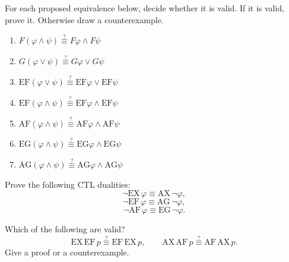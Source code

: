 \documentclass[11pt,a4paper]{tutorial}
\newcommand{\EX}{\mathrm{EX}}
\newcommand{\AX}{\mathrm{AX}}
\newcommand{\EF}{\mathrm{EF}}
\newcommand{\AF}{\mathrm{AF}}
\newcommand{\EG}{\mathrm{EG}}
\newcommand{\AG}{\mathrm{AG}}
\begin{document}
\begin{exercise}
For each proposed equivalence below, decide whether it is valid.
If it is valid, prove it.  Otherwise draw a counterexample.
\begin{enumerate}[label=(\alph*),itemsep=0.75\baselineskip]
  \item \hfil
  \(F(\varphi\land\psi)
    \stackrel{?}{\equiv}
    F\varphi\land F\psi\)
  \hfil

  \item \hfil
  \(G(\varphi\lor\psi)
    \stackrel{?}{\equiv}
    G\varphi\lor G\psi\)
  \hfil

  \item \hfil
  \(\EF(\varphi\lor\psi)
    \stackrel{?}{\equiv}
    \EF\varphi\lor \EF\psi\)
  \hfil

  \item \hfil
  \(\EF(\varphi\land\psi)
    \stackrel{?}{\equiv}
    \EF\varphi\land \EF\psi\)
  \hfil

  \item \hfil
  \(\AF(\varphi\land\psi)
    \stackrel{?}{\equiv}
    \AF\varphi\land \AF\psi\)
  \hfil

  \item \hfil
  \(\EG(\varphi\land\psi)
    \stackrel{?}{\equiv}
    \EG\varphi\land \EG\psi\)
  \hfil

  \item \hfil
  \(\AG(\varphi\land\psi)
    \stackrel{?}{\equiv}
    \AG\varphi\land \AG\psi\)
  \hfil
\end{enumerate}
\end{exercise}


\begin{exercise}
Prove the following CTL dualities:
\[
\neg \EX\,\varphi \equiv \AX\,\neg\varphi,
\]
\[
\neg \EF\,\varphi \equiv \AG\,\neg\varphi,
\]
\[
\neg \AF\,\varphi \equiv \EG\,\neg\varphi.
\]

Which of the following are valid?
\[
\EX\,\EF\,p \stackrel{?}{\equiv} \EF\,\EX\,p,
\qquad
\AX\,\AF\,p \stackrel{?}{\equiv} \AF\,\AX\,p.
\]
Give a proof or a counterexample.
\end{exercise}
\end{document}
